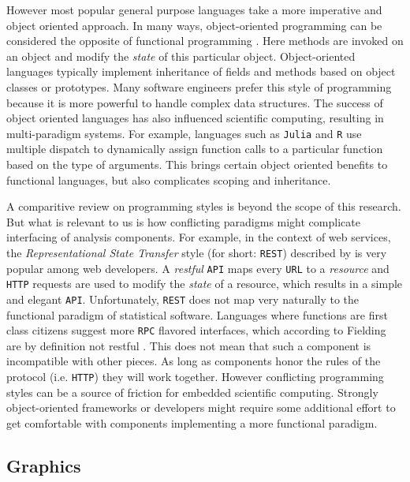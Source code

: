 \documentclass{article}
\newcommand{\URL}{\texttt{URL}\xspace}
\newcommand{\REST}{\texttt{REST}\xspace}
\newcommand{\R}{\texttt{R}\xspace}
\newcommand{\Julia}{\texttt{Julia}\xspace}
\newcommand{\HTTP}{\texttt{HTTP}\xspace}
\newcommand{\API}{\texttt{API}\xspace}
\newcommand{\RPC}{\texttt{RPC}\xspace}
\begin{document}
However most popular general purpose languages take a more imperative and object oriented approach. In many ways, object-oriented programming can be considered the opposite of functional programming \citep{pythonfunctional}. Here methods are invoked on an object and modify the \emph{state} of this particular object. Object-oriented languages typically implement inheritance of fields and methods based on object classes or prototypes. Many software engineers prefer this style of programming because it is more powerful to handle complex data structures. The success of object oriented languages has also influenced scientific computing, resulting in multi-paradigm systems. For example, languages such as \Julia and \R use multiple dispatch to dynamically assign function calls to a particular function based on the type of arguments. This brings certain object oriented benefits to functional languages, but also complicates scoping and inheritance. 

A comparitive review on programming styles is beyond the scope of this research. But what is relevant to us is how conflicting paradigms might complicate interfacing of analysis components. For example, in the context of web services, the \emph{Representational State Transfer} style (for short: \REST) described by \cite{fielding2000architectural} is very popular among web developers. A \emph{restful} \API maps every \URL to a \emph{resource} and \HTTP requests are used to modify the \emph{state} of a resource, which results in a simple and elegant \API. Unfortunately, \REST does not map very naturally to the functional paradigm of statistical software. Languages where functions are first class citizens suggest more \RPC flavored interfaces, which according to Fielding are by definition not restful \citep{fielding2008rest}. This does not mean that such a component is incompatible with other pieces. As long as components honor the rules of the protocol (i.e. \HTTP) they will work together. However conflicting programming styles can be a source of friction for embedded scientific computing. Strongly object-oriented frameworks or developers might require some additional effort to get comfortable with components implementing a more functional paradigm.



\subsection{Graphics}
\end{document}
